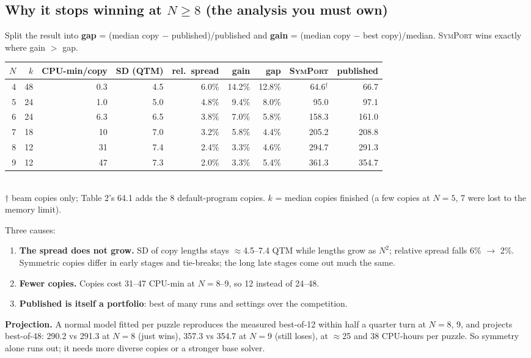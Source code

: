 \documentclass[10.5pt,a4paper]{article}
\newcommand{\M}[1]{\textsc{#1}}
\begin{document}
\subsection{Why it stops winning at $N\ge8$ (the analysis you must own)}
Split the result into \textbf{gap} = (median copy $-$ published)/published and \textbf{gain} = (median copy $-$ best copy)/median.
\M{SymPort} wins exactly where gain $>$ gap.
\begin{center}\small
\begin{tabular}{@{}rrrrrrrrr@{}}
\toprule
$N$ & $k$ & CPU-min/copy & SD (QTM) & rel.\ spread & gain & gap & \M{SymPort} & published \\
\midrule
4 & 48 & 0.3 & 4.5 & 6.0\% & 14.2\% & 12.8\% & 64.6$^\dagger$ & 66.7 \\
5 & 24 & 1.0 & 5.0 & 4.8\% & 9.4\% & 8.0\% & 95.0 & 97.1 \\
6 & 24 & 6.3 & 6.5 & 3.8\% & 7.0\% & 5.8\% & 158.3 & 161.0 \\
7 & 18 & 10 & 7.0 & 3.2\% & 5.8\% & 4.4\% & 205.2 & 208.8 \\
8 & 12 & 31 & 7.4 & 2.4\% & 3.3\% & 4.6\% & 294.7 & 291.3 \\
9 & 12 & 47 & 7.3 & 2.0\% & 3.3\% & 5.4\% & 361.3 & 354.7 \\
\bottomrule
\end{tabular}\\[2pt]
{\footnotesize $\dagger$ beam copies only; Table 2's 64.1 adds the 8 default-program copies. $k$ = median copies finished (a few
copies at $N=5$, 7 were lost to the memory limit).}
\end{center}
Three causes:
\begin{enumerate}
\item \textbf{The spread does not grow.} SD of copy lengths stays $\approx$4.5--7.4 QTM while lengths grow as $N^2$; relative spread
falls 6\% $\to$ 2\%. Symmetric copies differ in early stages and tie-breaks; the long late stages come out much the same.
\item \textbf{Fewer copies.} Copies cost 31--47 CPU-min at $N=8$--9, so 12 instead of 24--48.
\item \textbf{Published is itself a portfolio}: best of many runs and settings over the competition.
\end{enumerate}
\textbf{Projection.} A normal model fitted per puzzle reproduces the measured best-of-12 within half a quarter turn at $N=8$, 9, and
projects best-of-48: 290.2 vs 291.3 at $N=8$ (just wins), 357.3 vs 354.7 at $N=9$ (still loses), at $\approx$25 and 38 CPU-hours
per puzzle. So symmetry alone runs out; it needs more diverse copies or a stronger base solver.
\end{document}
